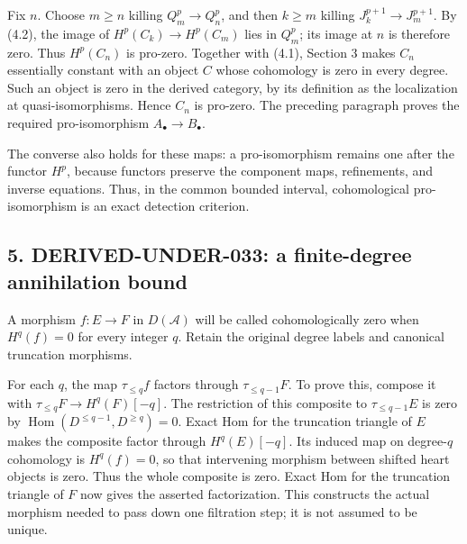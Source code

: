 \documentclass[11pt]{article}
\begin{document}
Fix \(n\). Choose \(m\geq n\) killing \(Q_m^p\to Q_n^p\),\allowbreak{} and then \(k\geq m\) killing \(J_k^{p+1}\to J_m^{p+1}\). By (4.2)\allowbreak{},\allowbreak{} the image of \(H^p(C_k)\to H^p(C_m)\) lies in \(Q_m^p\); its image at \(n\) is therefore zero. Thus \(H^p(C_n)\) is pro-zero. Together with (4.1)\allowbreak{},\allowbreak{} Section 3 makes \(C_n\) essentially constant with an object \(C\) whose cohomology is zero in every degree. Such an object is zero in the derived category,\allowbreak{} by its definition as the localization at quasi-isomorphisms. Hence \(C_n\) is pro-zero. The preceding paragraph proves the required pro-isomorphism \(A_\bullet\to B_\bullet\).

The converse also holds for these maps:\allowbreak{} a pro-isomorphism remains one after the functor \(H^p\),\allowbreak{} because functors preserve the component maps,\allowbreak{} refinements,\allowbreak{} and inverse equations. Thus,\allowbreak{} in the common bounded interval,\allowbreak{} cohomological pro-isomorphism is an exact detection criterion.

\subsection{\texorpdfstring{5. DERIVED-UNDER-033:\allowbreak{} a finite-degree annihilation bound}{5.  a finite-degree annihilation bound}}\label{proofs-12380-12604-derived-under-033-a-finite-degree-annihilation-bound}

A morphism \(f:E\to F\) in \(D(\mathcal A)\) will be called cohomologically zero when \(H^q(f)=0\) for every integer \(q\). Retain the original degree labels and canonical truncation morphisms.

For each \(q\),\allowbreak{} the map \(\tau_{\leq q}f\) factors through \(\tau_{\leq q-1}F\). To prove this,\allowbreak{} compose it with \(\tau_{\leq q}F\to H^q(F)[-q]\). The restriction of this composite to \(\tau_{\leq q-1}E\) is zero by \(\operatorname{Hom}(D^{\leq q-1},D^{\geq q})=0\). Exact Hom for the truncation triangle of \(E\) makes the composite factor through \(H^q(E)[-q]\). Its induced map on degree-\(q\) cohomology is \(H^q(f)=0\),\allowbreak{} so that intervening morphism between shifted heart objects is zero. Thus the whole composite is zero. Exact Hom for the truncation triangle of \(F\) now gives the asserted factorization. This constructs the actual morphism needed to pass down one filtration step; it is not assumed to be unique.
\end{document}

